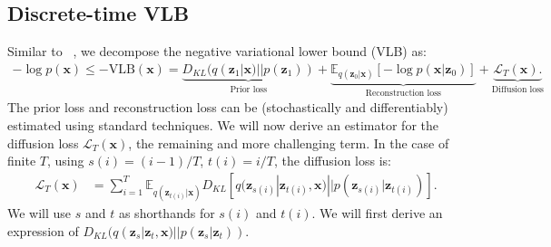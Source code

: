 \documentclass{article}
\def\rvx{{\mathbf{x}}}
\def\rvz{{\mathbf{z}}}
\newcommand{\E}{\mathbb{E}}
\newcommand{\lT}{\mathcal{L}_T(\rvx)}
\begin{document}
\subsection{Discrete-time VLB}
Similar to ~\citep{sohl2015deep}, we decompose the negative variational lower bound (VLB) as:
\begin{align}
    - \log p(\rvx) \leq - \text{VLB}(\rvx) =
    \underbrace{D_{KL}(q(\rvz_1|\rvx)||p(\rvz_1))
}_{\text{Prior loss}}
    + \underbrace{\E_{q(\rvz_0|\rvx)}\left[ - \log p(\rvx|\rvz_0) \right]
    }_{\text{Reconstruction loss}}
    +
    \underbrace{
    \lT.
    }_{\text{Diffusion loss}}
\end{align}
The prior loss and reconstruction loss can be (stochastically and differentiably) estimated using standard techniques. We will now derive an estimator for the diffusion loss $\lT$, the remaining and more challenging term. In the case of finite $T$, using $s(i) = (i-1)/T$, $t(i) = i/T$, the diffusion loss is:
\begin{align}
    \lT
    &= 
    \sum_{i=1}^T
    \E_{q(\rvz_{t(i)}|\rvx)} 
    D_{KL}[q(\rvz_{s(i)}|\rvz_{t(i)},\rvx)||p(\rvz_{s(i)}|\rvz_{t(i)})].
\end{align}
We will use $s$ and $t$ as shorthands for $s(i)$ and $t(i)$. We will first derive an expression of $D_{KL}(q(\rvz_s|\rvz_t,\rvx)||p(\rvz_s|\rvz_t))$.
\end{document}
